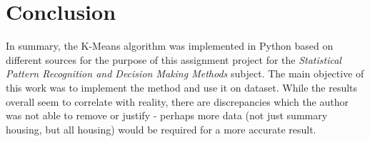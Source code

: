 \documentclass[a4paper]{article}
\begin{document}
\section{Conclusion}\label{section:conclusion}
In summary, the K-Means algorithm was implemented in Python based on different sources\cite{Sharma19082019}\cite{IgcWaW8BViU6zM4T} for the purpose of this assignment project for the \textit{Statistical Pattern Recognition and Decision Making Methods} subject. The main objective of this work was to implement the method and use it on dataset. While the results overall seem to correlate with reality, there are discrepancies which the author was not able to remove or justify - perhaps more data (not just summary housing, but all housing) would be required for a more accurate result.



\nocite{Sharma19082019}

 
\end{document}
